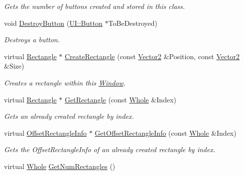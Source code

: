 \begin{DoxyCompactItemize}
\begin{DoxyCompactList}\small\item\em Gets the number of buttons created and stored in this class. \item\end{DoxyCompactList}\item 
void \hyperlink{classphys_1_1UI_1_1Window_a5a5bc10054d6e1d709b3b683a5554bf4}{DestroyButton} (\hyperlink{classphys_1_1UI_1_1Button}{UI::Button} $\ast$ToBeDestroyed)
\begin{DoxyCompactList}\small\item\em Destroys a button. \item\end{DoxyCompactList}\item 
virtual \hyperlink{classphys_1_1UI_1_1Rectangle}{Rectangle} $\ast$ \hyperlink{classphys_1_1UI_1_1Window_ad1c3c8c99868cde1c40f79d94aef4503}{CreateRectangle} (const \hyperlink{classphys_1_1Vector2}{Vector2} \&Position, const \hyperlink{classphys_1_1Vector2}{Vector2} \&Size)
\begin{DoxyCompactList}\small\item\em Creates a rectangle within this \hyperlink{classphys_1_1UI_1_1Window}{Window}. \item\end{DoxyCompactList}\item 
virtual \hyperlink{classphys_1_1UI_1_1Rectangle}{Rectangle} $\ast$ \hyperlink{classphys_1_1UI_1_1Window_a522a0af5999c8fae7009e09752b1a430}{GetRectangle} (const \hyperlink{namespacephys_a460f6bc24c8dd347b05e0366ae34f34a}{Whole} \&Index)
\begin{DoxyCompactList}\small\item\em Gets an already created rectangle by index. \item\end{DoxyCompactList}\item 
virtual \hyperlink{structphys_1_1UI_1_1ResizingInfo}{OffsetRectangleInfo} $\ast$ \hyperlink{classphys_1_1UI_1_1Window_ae8593fa6cd22ed15dd0b0daf9dcb69d3}{GetOffsetRectangleInfo} (const \hyperlink{namespacephys_a460f6bc24c8dd347b05e0366ae34f34a}{Whole} \&Index)
\begin{DoxyCompactList}\small\item\em Gets the OffsetRectangleInfo of an already created rectangle by index. \item\end{DoxyCompactList}\item 
virtual \hyperlink{namespacephys_a460f6bc24c8dd347b05e0366ae34f34a}{Whole} \hyperlink{classphys_1_1UI_1_1Window_a4d2d8821df32a920e7389b37f50f7c6d}{GetNumRectangles} ()

\end{DoxyCompactItemize}
